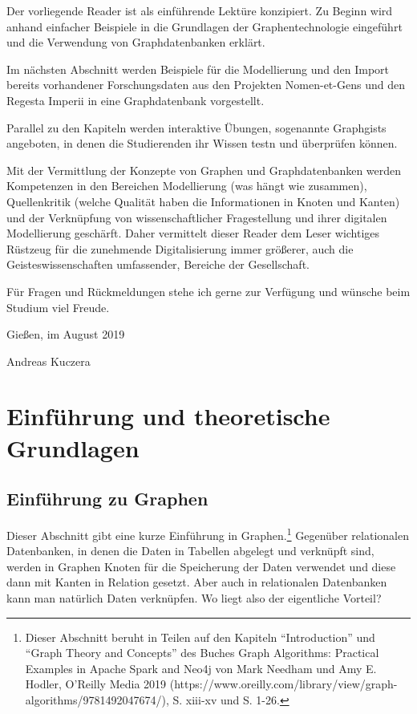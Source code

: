 \documentclass[ngerman,]{scrreprt}
\begin{document}
Der vorliegende Reader ist als einführende Lektüre konzipiert. Zu Beginn wird anhand einfacher Beispiele in die Grundlagen der Graphentechnologie eingeführt und die Verwendung von Graphdatenbanken erklärt.

Im nächsten Abschnitt werden Beispiele für die Modellierung und den Import bereits vorhandener Forschungsdaten aus den Projekten Nomen-et-Gens und den Regesta Imperii in eine Graphdatenbank vorgestellt.

Parallel zu den Kapiteln werden interaktive Übungen, sogenannte Graphgists angeboten, in denen die Studierenden ihr Wissen testn und überprüfen können.

Mit der Vermittlung der Konzepte von Graphen und Graphdatenbanken werden Kompetenzen in den Bereichen Modellierung (was hängt wie zusammen), Quellenkritik (welche Qualität haben die Informationen in Knoten und Kanten) und der Verknüpfung von wissenschaftlicher Fragestellung und ihrer digitalen Modellierung geschärft. Daher vermittelt dieser Reader dem Leser wichtiges Rüstzeug für die zunehmende Digitalisierung immer größerer, auch die Geisteswissenschaften umfassender, Bereiche der Gesellschaft.

Für Fragen und Rückmeldungen stehe ich gerne zur Verfügung und wünsche beim Studium viel Freude.

Gießen, im August 2019

Andreas Kuczera

\hypertarget{einfuxfchrung-und-theoretische-grundlagen}{%
\chapter{Einführung und theoretische Grundlagen}\label{einfuxfchrung-und-theoretische-grundlagen}}

\hypertarget{einfuxfchrung-zu-graphen}{%
\section{Einführung zu Graphen}\label{einfuxfchrung-zu-graphen}}

Dieser Abschnitt gibt eine kurze Einführung in Graphen.\footnote{Dieser Abschnitt beruht in Teilen auf den Kapiteln ``Introduction'' und ``Graph Theory and Concepts'' des Buches Graph Algorithms: Practical Examples in Apache Spark and Neo4j von Mark Needham und Amy E. Hodler, O'Reilly Media 2019 (https://www.oreilly.com/library/view/graph-algorithms/9781492047674/), S. xiii-xv und S. 1-26.} Gegenüber relationalen Datenbanken, in denen die Daten in Tabellen abgelegt und verknüpft sind, werden in Graphen Knoten für die Speicherung der Daten verwendet und diese dann mit Kanten in Relation gesetzt. Aber auch in relationalen Datenbanken kann man natürlich Daten verknüpfen. Wo liegt also der eigentliche Vorteil?
\end{document}

